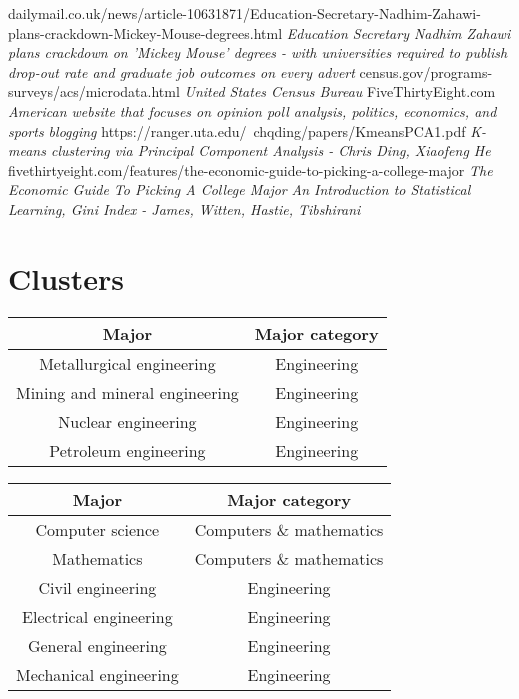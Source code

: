 \documentclass[11pt]{article}
\begin{document}
\newpage
\begin{thebibliography}{9}
        dailymail.co.uk/news/article-10631871/Education-Secretary-Nadhim-Zahawi-plans-crackdown-Mickey-Mouse-degrees.html \emph{Education Secretary Nadhim Zahawi plans crackdown on 'Mickey Mouse' degrees - with universities required to publish drop-out rate and graduate job outcomes on every advert}
        census.gov/programs-surveys/acs/microdata.html \emph{United States Census Bureau}
        FiveThirtyEight.com \emph{American website that focuses on opinion poll analysis, politics, economics, and sports blogging}
        https://ranger.uta.edu/~chqding/papers/KmeansPCA1.pdf
        \emph{K-means clustering via Principal Component Analysis - Chris Ding, Xiaofeng He}
        fivethirtyeight.com/features/the-economic-guide-to-picking-a-college-major \emph{The Economic Guide To Picking A College Major}
        \emph{An Introduction to Statistical Learning, Gini Index - James, Witten, Hastie, Tibshirani}

\end{thebibliography}

\newpage
\appendix
\section {Clusters}

\begin{center}
    \begin{tabular} {|| c c ||}
    \hline
    Major & Major category \\ [0.5ex]
    \hline\hline
    Metallurgical engineering & Engineering \\
    \hline
    Mining and mineral engineering & Engineering \\
    \hline
    Nuclear engineering & Engineering \\
    \hline
    Petroleum engineering & Engineering \\
    \hline
    \end {tabular}
\end{center}

\begin{center}
    \begin{tabular} {|| c c ||}
    \hline
    Major & Major category \\ [0.5ex]
    \hline\hline

    Computer science & Computers \& mathematics \\
    \hline
    Mathematics & Computers \& mathematics \\
    \hline
    Civil engineering & Engineering \\
    \hline
    Electrical engineering & Engineering \\
    \hline
    General engineering & Engineering \\
    \hline
    Mechanical engineering & Engineering \\
    \hline
    \end {tabular}
\end{center}
\end{document}
